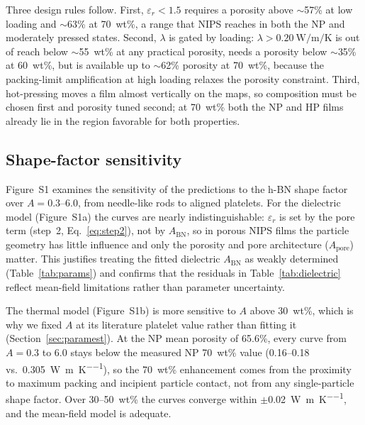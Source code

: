 \documentclass[preprint,a4paper]{elsarticle}
\newcommand{\eps}{\ensuremath{\varepsilon_r}}   %
\newcommand{\lam}{\ensuremath{\lambda}}
\newcommand{\Apore}{\ensuremath{A_{\mathrm{pore}}}}
\newcommand{\ABN}{\ensuremath{A_{\mathrm{BN}}}}
\begin{document}
Three design rules follow. First, $\eps < 1.5$ requires a porosity above $\sim$57\% at low loading and $\sim$63\% at 70~wt\%, a range that NIPS reaches in both the NP and moderately pressed states. Second, \lam{} is gated by loading: $\lam > \SI{0.20}{\watt\per\meter\per\kelvin}$ is out of reach below $\sim$55~wt\% at any practical porosity, needs a porosity below $\sim$35\% at 60~wt\%, but is available up to $\sim$62\% porosity at 70~wt\%, because the packing-limit amplification at high loading relaxes the porosity constraint. Third, hot-pressing moves a film almost vertically on the maps, so composition must be chosen first and porosity tuned second; at 70~wt\% both the NP and HP films already lie in the region favorable for both properties.

\subsection{Shape-factor sensitivity}
\label{sec:shapefactor}
Figure~S1 examines the sensitivity of the predictions to the h-BN shape factor over $A = 0.3$--6.0, from needle-like rods to aligned platelets. For the dielectric model (Figure~S1a) the curves are nearly indistinguishable: \eps{} is set by the pore term (step~2, Eq.~\ref{eq:step2}), not by \ABN, so in porous NIPS films the particle geometry has little influence and only the porosity and pore architecture (\Apore) matter. This justifies treating the fitted dielectric \ABN{} as weakly determined (Table~\ref{tab:params}) and confirms that the residuals in Table~\ref{tab:dielectric} reflect mean-field limitations rather than parameter uncertainty.

The thermal model (Figure~S1b) is more sensitive to $A$ above 30~wt\%, which is why we fixed $A$ at its literature platelet value rather than fitting it (Section~\ref{sec:paramest}). At the NP mean porosity of 65.6\%, every curve from $A = 0.3$ to 6.0 stays below the measured NP 70~wt\% value (0.16--0.18 vs.\ \SI{0.305}{\watt\per\meter\per\kelvin}), so the 70~wt\% enhancement comes from the proximity to maximum packing and incipient particle contact, not from any single-particle shape factor. Over 30--50~wt\% the curves converge within $\pm$\SI{0.02}{\watt\per\meter\per\kelvin}, and the mean-field model is adequate.
\end{document}
